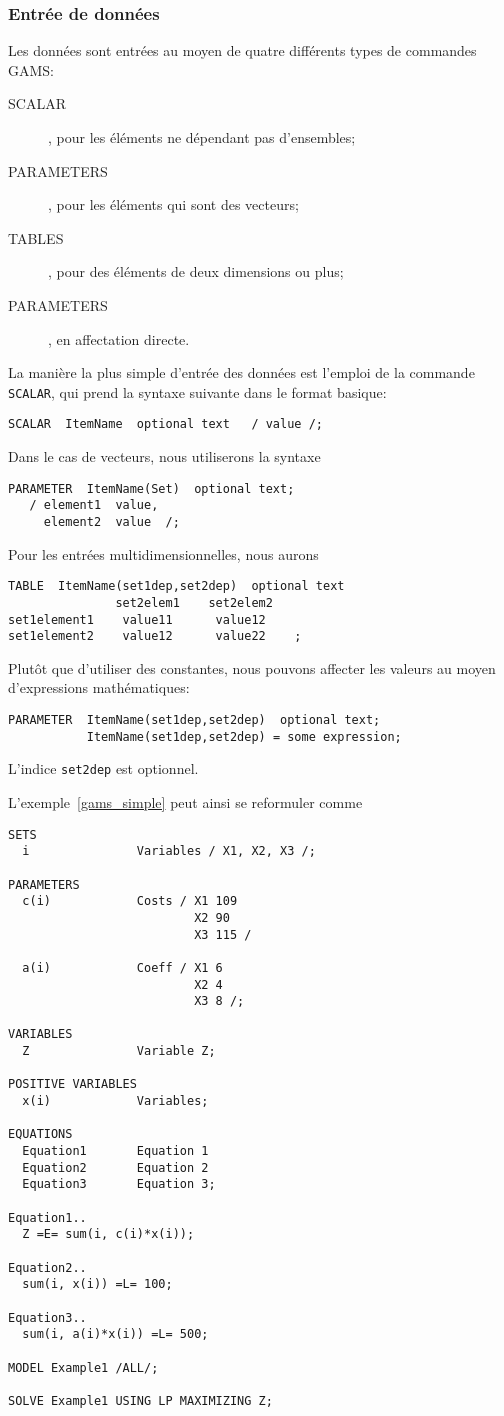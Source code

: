 \subsubsection{Entrée de données}

Les données sont entrées au moyen de quatre différents types de commandes GAMS:
\begin{description}
\item[SCALAR], pour les éléments ne dépendant pas d'ensembles; 
\item[PARAMETERS], pour les éléments qui sont des vecteurs;
\item[TABLES], pour des éléments de deux dimensions ou plus;
\item[PARAMETERS], en affectation directe.
\end{description}
La manière la plus simple d'entrée des données est l'emploi de la commande \verb|SCALAR|, qui prend la syntaxe suivante dans le format basique:
\begin{verbatim}
SCALAR  ItemName  optional text   / value /;
\end{verbatim}
Dans le cas de vecteurs, nous utiliserons la syntaxe
\begin{verbatim}
PARAMETER  ItemName(Set)  optional text;
   / element1  value,
     element2  value  /;
\end{verbatim}
Pour les entrées multidimensionnelles, nous aurons
\begin{verbatim}
TABLE  ItemName(set1dep,set2dep)  optional text
               set2elem1    set2elem2
set1element1    value11      value12
set1element2    value12      value22    ;
\end{verbatim}
Plutôt que d'utiliser des constantes, nous pouvons affecter les valeurs au moyen d'expressions mathématiques:
\begin{verbatim}
PARAMETER  ItemName(set1dep,set2dep)  optional text;
           ItemName(set1dep,set2dep) = some expression;
\end{verbatim}
L'indice \verb|set2dep| est optionnel.

L'exemple~\ref{gams_simple} peut ainsi se reformuler comme
\begin{verbatim}
SETS
  i               Variables / X1, X2, X3 /;

PARAMETERS
  c(i)            Costs / X1 109
                          X2 90
                          X3 115 /

  a(i)            Coeff / X1 6
                          X2 4
                          X3 8 /;

VARIABLES
  Z               Variable Z;

POSITIVE VARIABLES
  x(i)            Variables;

EQUATIONS
  Equation1       Equation 1
  Equation2       Equation 2
  Equation3       Equation 3;

Equation1..
  Z =E= sum(i, c(i)*x(i));

Equation2..
  sum(i, x(i)) =L= 100;

Equation3..
  sum(i, a(i)*x(i)) =L= 500;

MODEL Example1 /ALL/;

SOLVE Example1 USING LP MAXIMIZING Z;
\end{verbatim}

